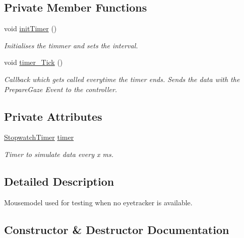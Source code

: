 \subsection*{Private Member Functions}
\begin{DoxyCompactItemize}
\item 
void \hyperlink{class_web_analyzer_1_1_test_1_1_communication_1_1_mouse_model_ab5f8535f5bfb5970dcc3b9b21fb575ff}{init\+Timer} ()
\begin{DoxyCompactList}\small\item\em Initialises the timmer and sets the interval. \end{DoxyCompactList}\item 
void \hyperlink{class_web_analyzer_1_1_test_1_1_communication_1_1_mouse_model_af4b46621b6d50778b6f0f1c03b4ddb3a}{timer\+\_\+\+Tick} ()
\begin{DoxyCompactList}\small\item\em Callback which gets called everytime the timer ends. Sends the data with the Prepare\+Gaze Event to the controller. \end{DoxyCompactList}\end{DoxyCompactItemize}
\subsection*{Private Attributes}
\begin{DoxyCompactItemize}
\item 
\hyperlink{class_web_analyzer_1_1_util_1_1_stopwatch_timer}{Stopwatch\+Timer} \hyperlink{class_web_analyzer_1_1_test_1_1_communication_1_1_mouse_model_a23daaf5b022d16c45c6f9d0084da2819}{timer}
\begin{DoxyCompactList}\small\item\em Timer to simulate data every x ms. \end{DoxyCompactList}\end{DoxyCompactItemize}


\subsection{Detailed Description}
Mousemodel used for testing when no eyetracker is available. 



\subsection{Constructor \& Destructor Documentation}
\hypertarget{class_web_analyzer_1_1_test_1_1_communication_1_1_mouse_model_ad84f4a65000f2e03f7003546d5e63dd2}{}
